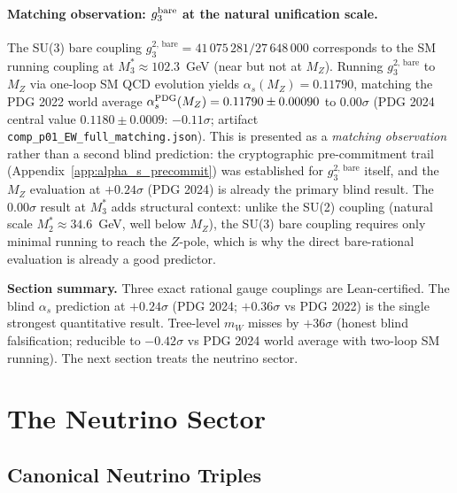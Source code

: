 \documentclass[11pt]{article}
\theoremstyle{remark}
\begin{document}
\paragraph{Matching observation: $g_3^{\rm bare}$ at the natural unification scale.}
The SU(3) bare coupling $g_3^{2,\,\mathrm{bare}} = 41\,075\,281/27\,648\,000$ corresponds to the SM running coupling at $M_3^* \approx 102.3$~GeV (near but not at $M_Z$).  Running $g_3^{2,\,\mathrm{bare}}$ to $M_Z$ via one-loop SM QCD evolution yields $\alpha_s(M_Z) = 0.11790$, matching the PDG 2022 world average $\alpha_s^{\rm PDG}(M_Z) = 0.11790 \pm 0.00090$ to $0.00\sigma$ (PDG 2024 central value $0.1180 \pm 0.0009$: $-0.11\sigma$; artifact \texttt{comp\_p01\_EW\_full\_matching.json}).  This is presented as a \emph{matching observation} rather than a second blind prediction: the cryptographic pre-commitment trail (Appendix~\ref{app:alpha_s_precommit}) was established for $g_3^{2,\,\mathrm{bare}}$ itself, and the $M_Z$ evaluation at $+0.24\sigma$ (PDG 2024) is already the primary blind result.  The $0.00\sigma$ result at $M_3^*$ adds structural context: unlike the SU(2) coupling (natural scale $M_2^* \approx 34.6$~GeV, well below $M_Z$), the SU(3) bare coupling requires only minimal running to reach the $Z$-pole, which is why the direct bare-rational evaluation is already a good predictor.

\begin{tcolorbox}[colback=gray!4,colframe=gray!40,left=5pt,right=5pt,top=3pt,bottom=3pt]
\small\textbf{Section summary.}
Three exact rational gauge couplings are Lean-certified.  The blind $\alpha_s$ prediction at $+0.24\sigma$ (PDG 2024; $+0.36\sigma$ vs PDG 2022) is the single strongest quantitative result.  Tree-level $m_W$ misses by $+36\sigma$ (honest blind falsification; reducible to $-0.42\sigma$ vs PDG 2024 world average with two-loop SM running).
The next section treats the neutrino sector.
\end{tcolorbox}

\section{The Neutrino Sector}
\label{sec:neutrinos}

\subsection{Canonical Neutrino Triples}
\end{document}
